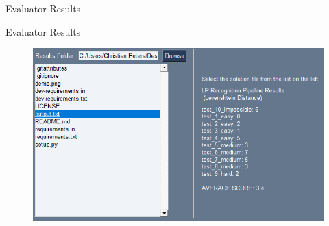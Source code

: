 \begin{frame}[standout]
    Evaluator Results
\end{frame}

\begin{frame}{Evaluator Results}
    \begin{figure}
        \centering
        \includegraphics[width=\textwidth]{img/evaluator_results}
    \end{figure}
\end{frame}
